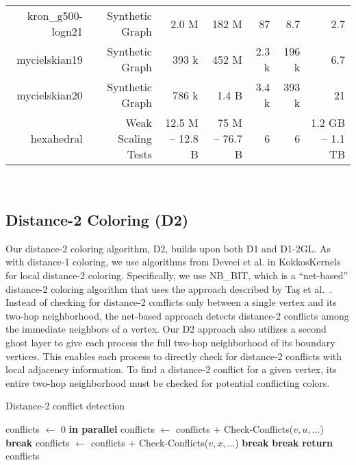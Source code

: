 \begin{table*}[!t]
\begin{tabular}{|r|r|r|r|r|r|r|}
    kron\_g500-logn21 & Synthetic Graph & 2.0 M   & 182 M   & 87    & 8.7 & 2.7\\
    mycielskian19     & Synthetic Graph & 393 k   & 452 M   & 2.3 k & 196 k & 6.7\\
    mycielskian20     & Synthetic Graph & 786 k   & 1.4 B   & 3.4 k & 393 k & 21\\
    \hline
    hexahedral & Weak Scaling Tests & 12.5 M -- 12.8 B & 75 M -- 76.7 B & 6 & 6 & 1.2 GB -- 1.1 TB\\
    \hline
  \end{tabular}\\
  \label{IAB:tab:graphs}
\end{table*}

\subsection{Distance-2 Coloring (D2)}

Our distance-2 coloring algorithm, D2, builds upon both D1 and D1-2GL.
As with distance-1 coloring, we use algorithms from Deveci et al. in KokkosKernels for local distance-2 coloring.
Specifically, we use NB\_BIT, which is a ``net-based'' distance-2 coloring algorithm that uses the approach described by Ta{\c{s}} et al.~\cite{IAB:tacs2017greed}. 
Instead of checking for distance-2 conflicts only between a single vertex and its two-hop neighborhood, the net-based approach detects distance-2 conflicts among the immediate neighbors of a vertex.
Our D2 approach also utilizes a second ghost layer to give each process the full two-hop neighborhood of its boundary vertices.
This enables each process to directly check for distance-2 conflicts with local adjacency information. 
To find a distance-2 conflict for a given vertex, its entire two-hop neighborhood must be checked for potential conflicting colors.

\begin{algorithm}
\algrenewcommand\algorithmicindent{1.0em}
\caption{Distance-2 conflict detection}
\label{IAB:alg:d2con}
\begin{algorithmic}
  \State conflicts $\gets$ 0
   \textbf{in parallel}
        \State conflicts $\gets$ conflicts $+$ Check-Conflicts($v,u,\ldots$)
	  \State \textbf{break}
        \EndIf
      \EndIf
	\State {}
	\State conflicts $\gets$ conflicts $+$ Check-Conflicts($v,x,\ldots$)
	  \State \textbf{break}
	\EndIf
      \EndFor
	\State \textbf{break}
      \EndIf
    \EndFor
  \EndFor
\State \textbf{return} conflicts
\EndProcedure
\end{algorithmic}
\end{algorithm}


